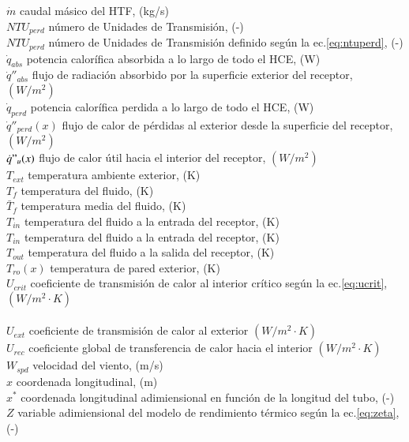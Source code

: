 \begin{tabbing}
$\dot m$ \> caudal másico del HTF, (kg/s) \\
$NTU_{perd}$ \> número de Unidades de Transmisión, (-) \\
$NTU_{perd}$ \> número de Unidades de Transmisión definido según la ec.\eqref{eq:ntuperd}, (-) \\
$\dot q_{abs}$ \> potencia calorífica absorbida a lo largo de todo el HCE, (W) \\
$\dot q''_{abs}$ \> flujo de radiación absorbido por la superficie exterior del receptor, $(W/m^{2})$ \\
$\dot q_{perd}$ \> potencia calorífica perdida a lo largo de todo el HCE, (W) \\
$\dot q''_{perd}(x)$ \> flujo de calor de pérdidas al exterior desde la superficie del receptor, $(W/m^{2})$ \\
$\dot q"_{u}(x)$ \> flujo de calor útil hacia el interior del receptor,  $(W/m^{2})$ \\ 
$T_{ext}$ \> temperatura ambiente exterior, (K) \\
$T_{f}$ \> temperatura del fluido, (K) \\
$\bar{T}_{f}$ \> temperatura media del fluido, (K) \\
$T_{in}$ \> temperatura del fluido a la entrada del receptor, (K) \\
$T_{in}$ \>  temperatura del fluido a la entrada del receptor, (K) \\
$T_{out}$ \> temperatura del fluido a la salida del receptor, (K) \\
$T_{ro}(x)$ \> temperatura de pared exterior, (K) \\
$U_{crit}$ \>  coeficiente de transmisión de calor al interior crítico según la ec.\eqref{eq:ucrit}, $(W/m^{2}\cdot K)$  \\ \\
$U_{ext}$ \> coeficiente de transmisión de calor al exterior $(W/m^{2}\cdot K)$  \\
$U_{rec}$  \> coeficiente global de transferencia de calor hacia el interior $(W/m^{2}\cdot K)$  \\
$W_{spd}$ \> velocidad del viento, (m/s) \\
$x$ \> coordenada longitudinal, (m) \\
$x^*$ \> coordenada longitudinal adimiensional en función de la longitud del tubo, (-) \\
$Z$ \> variable adimiensional del modelo de rendimiento térmico según la ec.\eqref{eq:zeta}, (-) \\
\end{tabbing}


